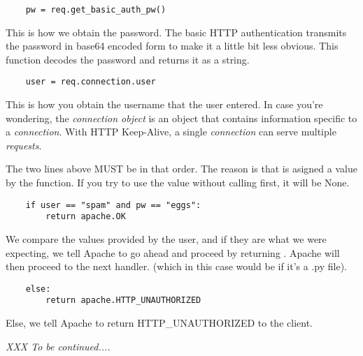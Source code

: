 \begin{verbatim}
    pw = req.get_basic_auth_pw()
\end{verbatim}
                  
This is how we obtain the password. The basic HTTP authentication
transmits the password in base64 encoded form to make it a little bit
less obvious. This function decodes the password and returns it as a
string.

\begin{verbatim}
    user = req.connection.user
\end{verbatim}
                  
This is how you obtain the username that the user entered. In case
you're wondering, the \emph{connection object} is an object that
contains information specific to a \emph{connection}. With HTTP
Keep-Alive, a single \emph{connection} can serve multiple \emph{requests}.

 The two lines above MUST be in that order. The reason is that
 is asigned a value by the 
function. If you try to use the  value without calling
 first, it will be None.

\begin{verbatim}
    if user == "spam" and pw == "eggs":
        return apache.OK
\end{verbatim}

We compare the values provided by the user, and if they are what we
were expecting, we tell Apache to go ahead and proceed by returning
. Apache will then proceed to the next handler. (which in
this case would be  if it's a .py file).

\begin{verbatim}
    else:
        return apache.HTTP_UNAUTHORIZED 
\end{verbatim}

Else, we tell Apache to return HTTP_UNAUTHORIZED to the client. 

\emph{XXX To be continued....}

